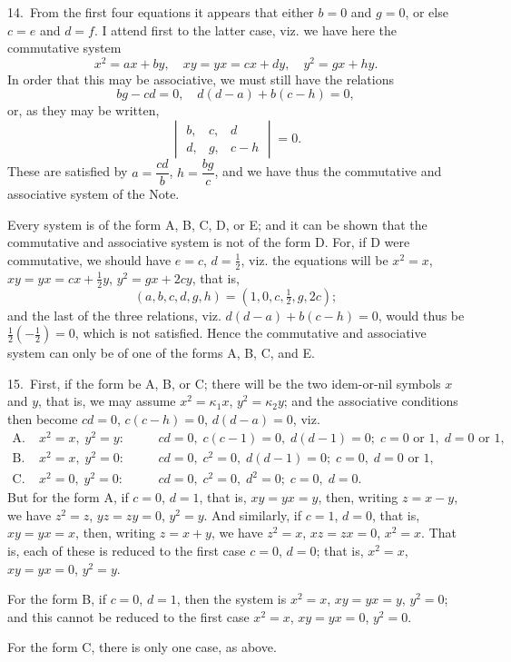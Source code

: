 \documentclass[11pt,a4paper]{book}
\begin{document}
14.~From the first four equations it appears that either $b=0$ and $g=0$, or else $c=e$ and $d=f$. I attend first to the latter case, viz. we have here the commutative system
\[
x^2=ax+by,\quad xy=yx=cx+dy,\quad y^2=gx+hy.
\]
In order that this may be associative, we must still have the relations
\[
bg-cd=0,\quad d(d-a)+b(c-h)=0,
\]
or, as they may be written,
\[
\begin{vmatrix} b, & c, & d \\ d, & g, & c-h \end{vmatrix} = 0.
\]
These are satisfied by $a=\dfrac{cd}{b}$, $h=\dfrac{bg}{c}$, and we have thus the commutative and associative system of the Note.

Every system is of the form A, B, C, D, or E; and it can be shown that the commutative and associative system is not of the form D. For, if D were commutative, we should have $e=c$, $d=\frac{1}{2}$, viz. the equations will be $x^2=x$, $xy=yx=cx+\frac{1}{2}y$, $y^2=gx+2cy$, that is,
\[
(a,b,c,d,g,h) = (1,0,c,\tfrac{1}{2},g,2c);
\]
and the last of the three relations, viz. $d(d-a)+b(c-h)=0$, would thus be $\frac{1}{2}(-\frac{1}{2})=0$, which is not satisfied. Hence the commutative and associative system can only be of one of the forms A, B, C, and E.

15.~First, if the form be A, B, or C; there will be the two idem-or-nil symbols $x$ and $y$, that is, we may assume $x^2=\kappa_1x$, $y^2=\kappa_2y$; and the associative conditions then become $cd=0$, $c(c-h)=0$, $d(d-a)=0$, viz.
\begin{align*}
\text{A.}\;& x^2=x,\; y^2=y:\quad && cd=0,\; c(c-1)=0,\; d(d-1)=0;\; c=0\text{ or }1,\; d=0\text{ or }1,\\
\text{B.}\;& x^2=x,\; y^2=0:\quad && cd=0,\; c^2=0,\; d(d-1)=0;\; c=0,\; d=0\text{ or }1,\\
\text{C.}\;& x^2=0,\; y^2=0:\quad && cd=0,\; c^2=0,\; d^2=0;\; c=0,\; d=0.
\end{align*}
But for the form A, if $c=0$, $d=1$, that is, $xy=yx=y$, then, writing $z=x-y$, we have $z^2=z$, $yz=zy=0$, $y^2=y$. And similarly, if $c=1$, $d=0$, that is, $xy=yx=x$, then, writing $z=x+y$, we have $z^2=x$, $xz=zx=0$, $x^2=x$. That is, each of these is reduced to the first case $c=0$, $d=0$; that is, $x^2=x$, $xy=yx=0$, $y^2=y$.

For the form B, if $c=0$, $d=1$, then the system is $x^2=x$, $xy=yx=y$, $y^2=0$; and this cannot be reduced to the first case $x^2=x$, $xy=yx=0$, $y^2=0$.

For the form C, there is only one case, as above.
\end{document}
